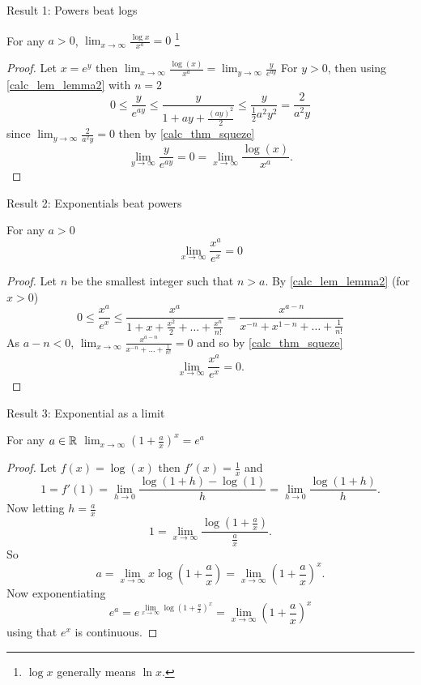 \documentclass[10pt, a4paper]{article}
\begin{document}
Result 1: Powers beat logs

For any $a > 0$, $\displaystyle\lim_{x \rightarrow \infty}\frac{\log x}{x ^ a} = 0$
\footnote{$\log x$ generally means $\ln x$.}
\begin{proof}
    Let $x = e ^ y$ then $\displaystyle\lim_{x \rightarrow \infty}\frac{\log(x)}{x ^ a} = \lim_{y \rightarrow \infty}\frac{y}{e ^ {ay}}$
    For $y > 0$,
    then using \autoref{calc_lem_lemma2} with $n = 2$
    \[
    0 \leq \frac{y}{e ^ {ay}} \leq \frac{y}{1 + ay + \frac{(ay) ^ 2}{2}} \leq \frac{y}{\frac{1}{2}a ^ 2 y ^ 2} = \frac{2}{a ^ 2 y}
    \]
    since $\lim_{y \rightarrow \infty}\frac{2}{a ^ 2y} = 0$ then by \autoref{calc_thm_squeze}
    \[
    \lim_{y \rightarrow \infty}\frac{y}{e ^ {ay}} = 0 = \lim_{x \rightarrow \infty}\frac{\log(x)}{x ^ a}.
    \]
\end{proof}

Result 2: Exponentials beat powers

For any $a > 0$
\[
\lim_{x \rightarrow \infty}\frac{x ^ a}{e ^ x} = 0
\]
\begin{proof}
    Let $n$ be the smallest integer such that $n > a$.
    By \autoref{calc_lem_lemma2} (for $x > 0$)
    \[
    0 \leq \frac{x ^ a}{e ^ x} \leq \frac{x ^ a}{1 + x + \frac{x ^ 2}{2} + \dotsc + \frac{x ^ n}{n!}} = \frac{x ^ {a - n}}{x ^ {-n} + x ^ {1 - n} + \dotsc + \frac{1}{n!}}
    \]
    As $a - n < 0$,
    $\displaystyle\lim_{x \rightarrow \infty}\frac{x ^ {a - n}}{x ^ {-n} + \dotsc + \frac{1}{n!}} = 0$
    and so by \autoref{calc_thm_squeze}
    \[
    \lim_{x \rightarrow \infty}\frac{x ^ a}{e ^ x} = 0.
    \]
\end{proof}

Result 3: Exponential as a limit

For any $a \in \mathbb{R}$ $\displaystyle\lim_{x \rightarrow \infty}\left(1 + \frac{a}{x}\right) ^ x = e ^ a$
\begin{proof}
    Let $f(x) = \log(x)$ then $f'(x) = \frac{1}{x}$ and
    \[
    1 = f'(1) = \lim_{h \rightarrow 0}\frac{\log(1 + h) - \log(1)}{h} = \lim_{h \rightarrow 0}\frac{\log(1 + h)}{h}.
    \]
    Now letting $h = \frac{a}{x}$
    \[
    1 = \lim_{x \rightarrow \infty}\frac{\log\left(1 + \frac{a}{x}\right)}{\frac{a}{x}}.
    \]
    So
    \[
    a = \lim_{x \rightarrow \infty}x\log\left(1 + \frac{a}{x}\right) = \lim_{x \rightarrow \infty}\left(1 + \frac{a}{x}\right) ^ x.
    \]
    Now exponentiating
    \[
    e ^ a = e ^ {\lim_{x \rightarrow \infty}\log\left(1 + \frac{a}{x}\right) ^ x} = \lim_{x \rightarrow \infty}\left(1 + \frac{a}{x}\right) ^ x
    \]
    using that $e ^ x$ is continuous.
\end{proof}
\end{document}
